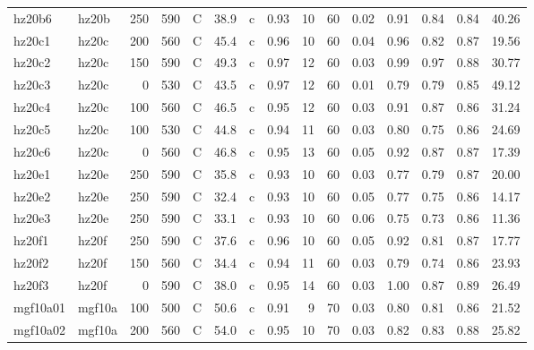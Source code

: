 \documentclass{article}
\begin{document}
\begin{landscape}
\begin{longtable}{llrrlrlrrrrrrrr}
      hz20b6 &      hz20b &  250 &  590 &     C &    38.9 &   c &  0.93 &  10 &         60 &  0.02 &  0.91 &  0.84 &  0.84 &   40.26 \\
      hz20c1 &      hz20c &  200 &  560 &     C &    45.4 &   c &  0.96 &  10 &         60 &  0.04 &  0.96 &  0.82 &  0.87 &   19.56 \\
      hz20c2 &      hz20c &  150 &  590 &     C &    49.3 &   c &  0.97 &  12 &         60 &  0.03 &  0.99 &  0.97 &  0.88 &   30.77 \\
      hz20c3 &      hz20c &    0 &  530 &     C &    43.5 &   c &  0.97 &  12 &         60 &  0.01 &  0.79 &  0.79 &  0.85 &   49.12 \\
      hz20c4 &      hz20c &  100 &  560 &     C &    46.5 &   c &  0.95 &  12 &         60 &  0.03 &  0.91 &  0.87 &  0.86 &   31.24 \\
      hz20c5 &      hz20c &  100 &  530 &     C &    44.8 &   c &  0.94 &  11 &         60 &  0.03 &  0.80 &  0.75 &  0.86 &   24.69 \\
      hz20c6 &      hz20c &    0 &  560 &     C &    46.8 &   c &  0.95 &  13 &         60 &  0.05 &  0.92 &  0.87 &  0.87 &   17.39 \\
      hz20e1 &      hz20e &  250 &  590 &     C &    35.8 &   c &  0.93 &  10 &         60 &  0.03 &  0.77 &  0.79 &  0.87 &   20.00 \\
      hz20e2 &      hz20e &  250 &  590 &     C &    32.4 &   c &  0.93 &  10 &         60 &  0.05 &  0.77 &  0.75 &  0.86 &   14.17 \\
      hz20e3 &      hz20e &  250 &  590 &     C &    33.1 &   c &  0.93 &  10 &         60 &  0.06 &  0.75 &  0.73 &  0.86 &   11.36 \\
      hz20f1 &      hz20f &  250 &  590 &     C &    37.6 &   c &  0.96 &  10 &         60 &  0.05 &  0.92 &  0.81 &  0.87 &   17.77 \\
      hz20f2 &      hz20f &  150 &  560 &     C &    34.4 &   c &  0.94 &  11 &         60 &  0.03 &  0.79 &  0.74 &  0.86 &   23.93 \\
      hz20f3 &      hz20f &    0 &  590 &     C &    38.0 &   c &  0.95 &  14 &         60 &  0.03 &  1.00 &  0.87 &  0.89 &   26.49 \\
    mgf10a01 &     mgf10a &  100 &  500 &     C &    50.6 &   c &  0.91 &   9 &         70 &  0.03 &  0.80 &  0.81 &  0.86 &   21.52 \\
    mgf10a02 &     mgf10a &  200 &  560 &     C &    54.0 &   c &  0.95 &  10 &         70 &  0.03 &  0.82 &  0.83 &  0.88 &   25.82 \\

\end{longtable}
\end{landscape}
\end{document}

